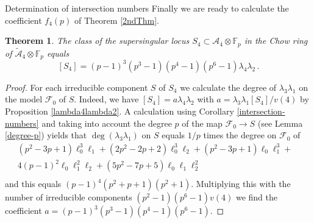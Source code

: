 \documentclass[11pt]{amsart}
\numberwithin{equation}{section}
\newcommand{\FF}{\mathbb F}
\newtheorem{theorem}{Theorem}[section]
\theoremstyle{definition}
\theoremstyle{remark}
\begin{document}
\begin{section}{Determination of intersection numbers}
Finally we are ready to calculate the coefficient $f_4(p)$ 
of Theorem \ref{2ndThm}.
\begin{theorem}
The class of the supersingular locus 
$S_4 \subset \mathcal{A}_4\otimes {\FF}_{p}$ in the Chow ring
of $\tilde{\mathcal{A}}_4 \otimes {\FF}_p$ equals
$$
[S_4]= (p-1)^3 (p^3-1)(p^4-1)(p^6-1) \lambda_4\lambda_2 \, .
$$
\end{theorem}
\begin{proof}
For each irreducible component $S$ of $S_4$ we calculate the degree of $\lambda_3\lambda_1$ on the model
$\mathcal{F}_0$ of $S$. Indeed, we have $[S_4]=a\lambda_4\lambda_2$ with
$a=\lambda_3\lambda_1 [S_4]/v(4)$ by Proposition \ref{lambda4lambda2}. A calculation
using Corollary \ref{intersection-numbers} and taking into account
the degree $p$ of the map $\mathcal{F}_0 \to S$ (see Lemma \ref{degree-p}) 
yields that $\deg(\lambda_3\lambda_1)$ on $S$ equals $1/p$ times
the degree on $\mathcal{F}_0$ of
$$
\begin{aligned}
(p^2-3p+1)\ell_0^3\ell_1+ (2p^2-2p+2)\ell_0^3\ell_2+ (p^2-3p+1)\ell_0\ell_1^3+&\\ 
4(p-1)^2\ell_0\ell_1^2\ell_2 +(5p^2-7p+5)\ell_0\ell_1\ell_2^2&\\
\end{aligned}
$$
and this equals $(p-1)^4 (p^2+p+1)(p^2+1)$. 
Multiplying this with the number
of irreducible components $(p^2-1)(p^6-1) v(4)$ we find the coefficient
 $a= (p-1)^3(p^3-1)(p^4-1)(p^6-1)$. 
\end{proof}
\end{section}
\end{document}
